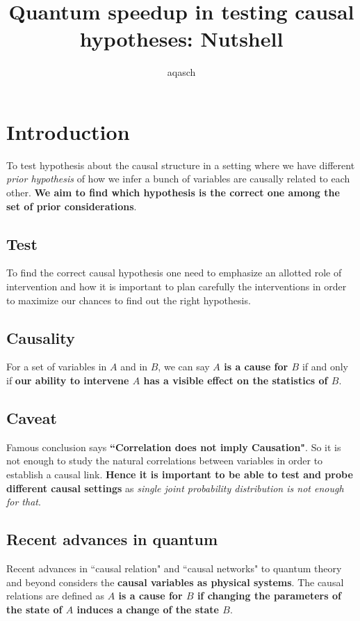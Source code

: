 \documentclass[a4paper,11pt]{article}
\begin{document}
	
	\title{Quantum speedup in testing causal hypotheses: Nutshell}
	\author{aqasch}
	\date{}
	\maketitle
	\section{Introduction}
	To test hypothesis about the causal structure in a setting where we have different \textit{prior hypothesis} of how we infer a bunch of variables are causally related to each other. \textbf{We aim to find which hypothesis is the correct one among the set of prior considerations}.
	
	\subsection{Test} To find the correct causal hypothesis one need to emphasize an allotted role of intervention and how it is important to plan carefully the interventions in order to maximize our chances to find out the right hypothesis.
	
	\subsection{Causality} For a set of variables in $A$ and in $B$, we can say \textbf{$A$ is a cause for $B$} if and only if \textbf{our ability to intervene $A$ has a visible effect on the statistics of $B$}.
	
	\subsection{Caveat} Famous conclusion says \textbf{``Correlation does not imply Causation"}. So it is not enough to study the natural correlations between variables in order to establish a causal link. \textbf{Hence it is important to be able to test and probe different causal settings} as \textit{single joint probability distribution is not enough for that}.
	
	\subsection{Recent advances in quantum}
	Recent advances in ``causal relation" and ``causal networks" to quantum theory and beyond considers the \textbf{causal variables as physical systems}. The causal relations are defined as \textbf{$A$ is a cause for $B$ if changing the parameters of the state of $A$ induces a change of the state $B$}.
	
\end{document}
